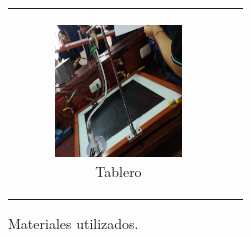 \documentclass[../main.tex]{subfiles}
\begin{document}
\begin{figure}[H]
\begin{tabular}{c c}
    \begin{subfigure}{0.5\textwidth}  
        \centering
        \includegraphics[width=0.8\linewidth, height=3.5cm]{images/materiales/mat7.jpg}
        \caption{Tablero}
        \label{fig:tablero}
    \end{subfigure} \\
    \end{tabular}
    
    \caption{Materiales utilizados.}
    \label{fig:materiales}
\end{figure}
\end{document}
